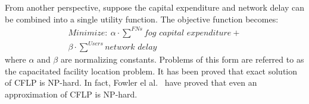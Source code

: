 \documentclass[10pt,journal,compsoc]{IEEEtran}
\begin{document}
%
%


 

From another perspective, suppose the capital expenditure and network delay can be combined into a single utility function. The objective function becomes:
\begin{align}
\textit{Minimize}: \ \alpha\cdot\overset{FNs}{\sum} \textit{fog capital expenditure} + \\
\beta \cdot \overset{Users}{\sum}\textit{network delay}\nonumber
\end{align}
where $\alpha$ and $\beta$ are normalizing constants.
Problems of this form are referred to as the capacitated facility location problem. It has been proved that exact solution of CFLP is NP-hard\cite{1984}. In fact, Fowler el al.~\cite{FOWLER1981133} have proved that even an approximation of CFLP is NP-hard.\\

\end{document}
